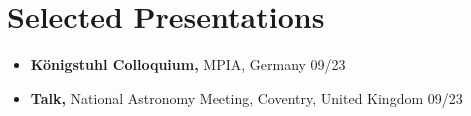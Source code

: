\documentclass[12pt, letterpaper]{hunt-cv}
\begin{document}
\section*{Selected Presentations}

\begin{itemize}
    \item \textbf{Königstuhl Colloquium,} MPIA, Germany \hfill 09/23
    \item \textbf{Talk,} National Astronomy Meeting, Coventry, United Kingdom \hfill 09/23


\end{itemize}
\end{document}
